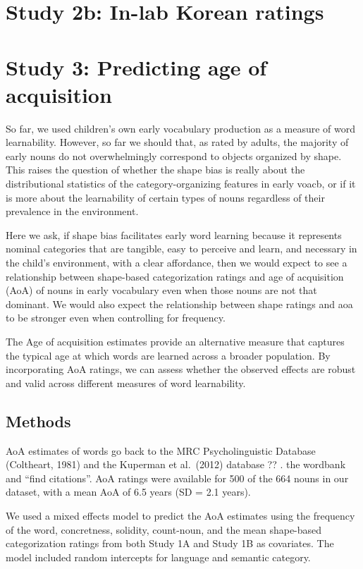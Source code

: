 \documentclass[
  american,
  man,floatsintext]{apa6}
\begin{document}
\section{Study 2b: In-lab Korean ratings}\label{study-2b-in-lab-korean-ratings}

\section{Study 3: Predicting age of acquisition}\label{study-3-predicting-age-of-acquisition}

So far, we used children's own early vocabulary production as a measure of word learnability. However, so far we should that, as rated by adults, the majority of early nouns do not overwhelmingly correspond to objects organized by shape. This raises the question of whether the shape bias is really about the distributional statistics of the category-organizing features in early voacb, or if it is more about the learnability of certain types of nouns regardless of their prevalence in the environment.

Here we ask, if shape bias facilitates early word learning because it represents nominal categories that are tangible, easy to perceive and learn, and necessary in the child's environment, with a clear affordance, then we would expect to see a relationship between shape-based categorization ratings and age of acquisition (AoA) of nouns in early vocabulary even when those nouns are not that dominant. We would also expect the relationship between shape ratings and aoa to be stronger even when controlling for frequency.

The Age of acquisition estimates provide an alternative measure that captures the typical age at which words are learned across a broader population. By incorporating AoA ratings, we can assess whether the observed effects are robust and valid across different measures of word learnability.

\subsection{Methods}\label{methods-2}

AoA estimates of words go back to the MRC Psycholinguistic Database (Coltheart, 1981) and the Kuperman et al.~(2012) database ?? . the wordbank and ``find citations''. AoA ratings were available for 500 of the 664 nouns in our dataset, with a mean AoA of 6.5 years (SD = 2.1 years).

We used a mixed effects model to predict the AoA estimates using the frequency of the word, concretness, solidity, count-noun, and the mean shape-based categorization ratings from both Study 1A and Study 1B as covariates. The model included random intercepts for language and semantic category.
\end{document}
